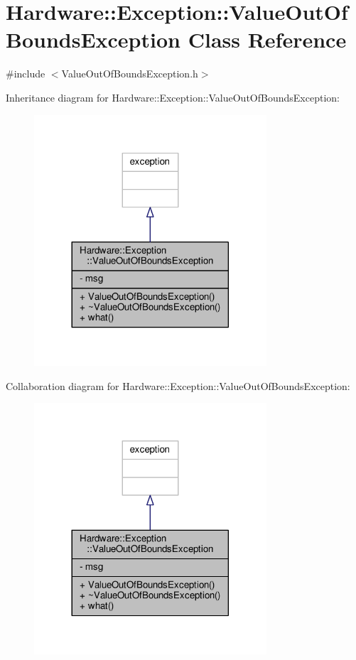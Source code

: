 \hypertarget{class_hardware_1_1_exception_1_1_value_out_of_bounds_exception}{}\section{Hardware\+:\+:Exception\+:\+:Value\+Out\+Of\+Bounds\+Exception Class Reference}
\label{class_hardware_1_1_exception_1_1_value_out_of_bounds_exception}


{\ttfamily \#include $<$Value\+Out\+Of\+Bounds\+Exception.\+h$>$}



Inheritance diagram for Hardware\+:\+:Exception\+:\+:Value\+Out\+Of\+Bounds\+Exception\+:\nopagebreak
\begin{figure}[H]
\begin{center}
\leavevmode
\includegraphics[width=245pt]{class_hardware_1_1_exception_1_1_value_out_of_bounds_exception__inherit__graph}
\end{center}
\end{figure}


Collaboration diagram for Hardware\+:\+:Exception\+:\+:Value\+Out\+Of\+Bounds\+Exception\+:\nopagebreak
\begin{figure}[H]
\begin{center}
\leavevmode
\includegraphics[width=245pt]{class_hardware_1_1_exception_1_1_value_out_of_bounds_exception__coll__graph}
\end{center}
\end{figure}
